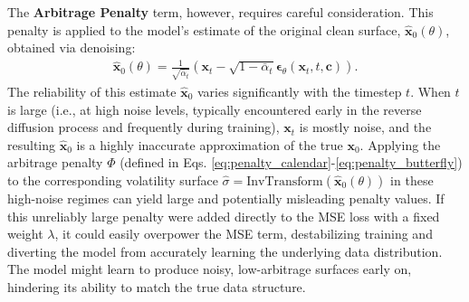 \documentclass{article}
\newcommand{\eqlnostar}[2]{\begin{align}\label{#1}#2\end{align}}
\begin{document}
The \textbf{Arbitrage Penalty} term, however, requires careful consideration. This penalty is applied to the model's estimate of the original clean surface, $\hat{\mathbf{x}}_0(\theta)$, obtained via denoising:
\eqlnostar{eq:denoised_estimate}{
\hat{\mathbf{x}}_0(\theta) = \frac{1}{\sqrt{\bar{\alpha}_t}} \left( \mathbf{x}_t - \sqrt{1 - \bar{\alpha}_t} \boldsymbol{\epsilon}_\theta(\mathbf{x}_t, t, \mathbf{c}) \right).
}
The reliability of this estimate $\hat{\mathbf{x}}_0$ varies significantly with the timestep $t$. When $t$ is large (i.e., at high noise levels, typically encountered early in the reverse diffusion process and frequently during training), $\mathbf{x}_t$ is mostly noise, and the resulting $\hat{\mathbf{x}}_0$ is a highly inaccurate approximation of the true $\mathbf{x}_0$. Applying the arbitrage penalty $\Phi$ (defined in Eqs. \ref{eq:penalty_calendar}-\ref{eq:penalty_butterfly}) to the corresponding volatility surface $\hat{\sigma} = \text{InvTransform}(\hat{\mathbf{x}}_0(\theta))$ in these high-noise regimes can yield large and potentially misleading penalty values. If this unreliably large penalty were added directly to the MSE loss with a fixed weight $\lambda$, it could easily overpower the MSE term, destabilizing training and diverting the model from accurately learning the underlying data distribution. The model might learn to produce noisy, low-arbitrage surfaces early on, hindering its ability to match the true data structure.
\end{document}
